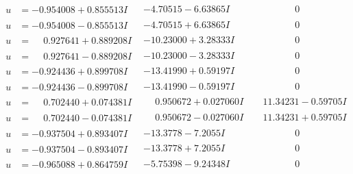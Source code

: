 \documentclass[1p]{elsarticle_modified}
\theoremstyle{definition}
\begin{document}
$$\begin{array}{c|c|c}
\begin{aligned}
u &= -0.954008 + 0.855513 I\end{aligned}
 & -4.70515 - 6.63865 I & \phantom{-0.000000 } 0 \\ \hline\begin{aligned}
u &= -0.954008 - 0.855513 I\end{aligned}
 & -4.70515 + 6.63865 I & \phantom{-0.000000 } 0 \\ \hline\begin{aligned}
u &= \phantom{-}0.927641 + 0.889208 I\end{aligned}
 & -10.23000 + 3.28333 I & \phantom{-0.000000 } 0 \\ \hline\begin{aligned}
u &= \phantom{-}0.927641 - 0.889208 I\end{aligned}
 & -10.23000 - 3.28333 I & \phantom{-0.000000 } 0 \\ \hline\begin{aligned}
u &= -0.924436 + 0.899708 I\end{aligned}
 & -13.41990 + 0.59197 I & \phantom{-0.000000 } 0 \\ \hline\begin{aligned}
u &= -0.924436 - 0.899708 I\end{aligned}
 & -13.41990 - 0.59197 I & \phantom{-0.000000 } 0 \\ \hline\begin{aligned}
u &= \phantom{-}0.702440 + 0.074381 I\end{aligned}
 & \phantom{-}0.950672 + 0.027060 I & \phantom{-}11.34231 - 0.59705 I \\ \hline\begin{aligned}
u &= \phantom{-}0.702440 - 0.074381 I\end{aligned}
 & \phantom{-}0.950672 - 0.027060 I & \phantom{-}11.34231 + 0.59705 I \\ \hline\begin{aligned}
u &= -0.937504 + 0.893407 I\end{aligned}
 & -13.3778 - 7.2055 I & \phantom{-0.000000 } 0 \\ \hline\begin{aligned}
u &= -0.937504 - 0.893407 I\end{aligned}
 & -13.3778 + 7.2055 I & \phantom{-0.000000 } 0 \\ \hline\begin{aligned}
u &= -0.965088 + 0.864759 I\end{aligned}
 & -5.75398 - 9.24348 I & \phantom{-0.000000 } 0 \\ \hline\begin{aligned}

\end{aligned}
\end{array}$$
\end{document}
